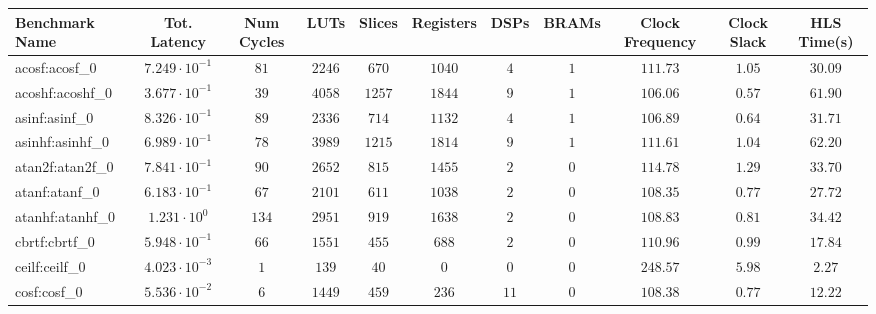 \begin{tabular}{|l|c|c|c|c|c|c|c|c|c|c|}
\hline
Benchmark Name               & Tot. Latency            & Num Cycles & LUTs      & Slices    & Registers & DSPs    & BRAMs & Clock Frequency & Clock Slack & HLS Time(s) \\
\hline
acosf:acosf\_0               & $ 7.249 \cdot 10^{-1} $ & $ 81     $ & $ 2246  $ & $ 670   $ & $ 1040  $ & $ 4   $ & $ 1 $ & $ 111.73      $ & $ 1.05    $ & $ 30.09   $ \\
acoshf:acoshf\_0             & $ 3.677 \cdot 10^{-1} $ & $ 39     $ & $ 4058  $ & $ 1257  $ & $ 1844  $ & $ 9   $ & $ 1 $ & $ 106.06      $ & $ 0.57    $ & $ 61.90   $ \\
asinf:asinf\_0               & $ 8.326 \cdot 10^{-1} $ & $ 89     $ & $ 2336  $ & $ 714   $ & $ 1132  $ & $ 4   $ & $ 1 $ & $ 106.89      $ & $ 0.64    $ & $ 31.71   $ \\
asinhf:asinhf\_0             & $ 6.989 \cdot 10^{-1} $ & $ 78     $ & $ 3989  $ & $ 1215  $ & $ 1814  $ & $ 9   $ & $ 1 $ & $ 111.61      $ & $ 1.04    $ & $ 62.20   $ \\
atan2f:atan2f\_0             & $ 7.841 \cdot 10^{-1} $ & $ 90     $ & $ 2652  $ & $ 815   $ & $ 1455  $ & $ 2   $ & $ 0 $ & $ 114.78      $ & $ 1.29    $ & $ 33.70   $ \\
atanf:atanf\_0               & $ 6.183 \cdot 10^{-1} $ & $ 67     $ & $ 2101  $ & $ 611   $ & $ 1038  $ & $ 2   $ & $ 0 $ & $ 108.35      $ & $ 0.77    $ & $ 27.72   $ \\
atanhf:atanhf\_0             & $ 1.231 \cdot 10^{0}  $ & $ 134    $ & $ 2951  $ & $ 919   $ & $ 1638  $ & $ 2   $ & $ 0 $ & $ 108.83      $ & $ 0.81    $ & $ 34.42   $ \\
cbrtf:cbrtf\_0               & $ 5.948 \cdot 10^{-1} $ & $ 66     $ & $ 1551  $ & $ 455   $ & $ 688   $ & $ 2   $ & $ 0 $ & $ 110.96      $ & $ 0.99    $ & $ 17.84   $ \\
ceilf:ceilf\_0               & $ 4.023 \cdot 10^{-3} $ & $ 1      $ & $ 139   $ & $ 40    $ & $ 0     $ & $ 0   $ & $ 0 $ & $ 248.57      $ & $ 5.98    $ & $ 2.27    $ \\
cosf:cosf\_0                 & $ 5.536 \cdot 10^{-2} $ & $ 6      $ & $ 1449  $ & $ 459   $ & $ 236   $ & $ 11  $ & $ 0 $ & $ 108.38      $ & $ 0.77    $ & $ 12.22   $ \\

\end{tabular}
